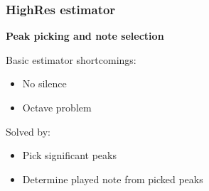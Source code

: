 \documentclass[table]{beamer}
\begin{document}
\begin{frame}
\frametitle{HighRes estimator}
    {\large \textbf{Peak picking and note selection}}
    \bigskip

    Basic estimator shortcomings:
    \begin{itemize}
        \item No silence
        \item Octave problem
    \end{itemize}
    \bigskip

    {\LARGE {}} Solved by:
    \begin{itemize}
        \item Pick significant peaks
        \item Determine played note from picked peaks
    \end{itemize}
\end{frame}
\end{document}
